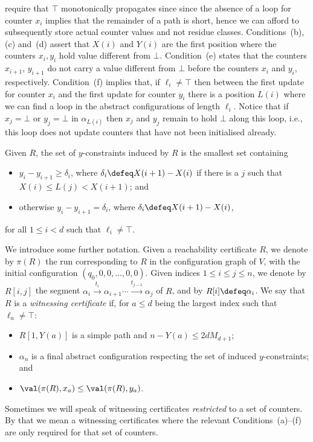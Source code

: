 require that $\top$ monotonically propagates since since the absence of
a loop for counter $x_i$ implies that the remainder of a path is
short, hence we can afford to subsequently store actual counter
values and not residue classes. Conditions~(b), (c) and~(d) assert
that $X(i)$ and $Y(i)$ are the first position where the counters
$x_i,y_i$ hold value different from $\bot$. Condition~(e) states that
the counters $x_{i+1}$, $y_{i+1}$ do not carry a value different from
$\bot$ before the counters $x_{i}$ and $y_{i}$,
respectively. Condition~(f) implies that, if $\ell_i\neq \top$ then
between the first update for counter $x_i$ and the first update for
counter $y_i$ there is a position $L(i)$ where we can find a loop in
the abstract configurations of length $\ell_i$. Notice that if
$x_j=\bot$ or $y_j=\bot$ in $\alpha_{L(i)}$ then $x_j$ and $y_j$
remain to hold $\bot$ along this loop, i.e., this loop does not update
counters that have not been initialised already.

Given $R$, the set of $y$-constraints induced by $R$ is the smallest
set containing
%
\begin{itemize}
\item $y_{i}-y_{i+1}\geq \delta_i$, where $\delta_i \defeq
  X(i+1)-X(i)$ if there is a $j$ such that $X(i)\le L(j) < X(i+1)$;
  and
\item otherwise $y_{i}-y_{i+1} = \delta_i$, where $\delta_i \defeq
  X(i+1)-X(i)$,
\end{itemize}
for all $1\le i< d$ such that $\ell_i\neq\top$.

We introduce some further notation. Given a reachability certificate
$R$, we denote by $\pi(R)$ the run corresponding to $R$ in the
configuration graph of $V$, with the initial configuration
$(q_0,0,0,\ldots,0,0)$. Given indices $1\le i\le j\le n$, we denote by $R[i,j]$ the
segment $\alpha_i \xrightarrow{t_i} \alpha_{i+1} \cdots
\xrightarrow{t_{j-1}} \alpha_j$ of $R$, and by $R[i]\defeq \alpha_i$.
We say that $R$ is a \emph{witnessing certificate} if, for $a\le d$
being the largest index such that $\ell_a \neq \top$:
%
\begin{itemize}
\item $R[1,Y(a)]$ is a simple path and $n-Y(a)\le 2dM_{d+1}$;
\item $\alpha_n$ is a final abstract configuration respecting the set
  of induced $y$-constraints; and
\item $\val(\pi(R),x_a) \le \val(\pi(R),y_a)$.
\end{itemize}
%
Sometimes we will speak of witnessing certificates \emph{restricted}
to a set of counters. By that we mean a witnessing certificates where
the relevant Conditions~(a)--(f) are only required for that set of
counters.

